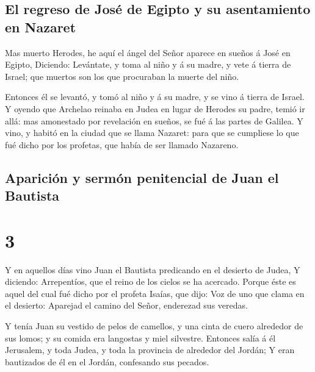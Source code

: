 \hypertarget{el-regreso-de-josuxe9-de-egipto-y-su-asentamiento-en-nazaret}{%
\subsection{El regreso de José de Egipto y su asentamiento en
Nazaret}\label{el-regreso-de-josuxe9-de-egipto-y-su-asentamiento-en-nazaret}}

 Mas muerto Herodes, he aquí el ángel del Señor aparece
en sueños á José en Egipto,  Diciendo: Levántate, y toma
al niño y á su madre, y vete á tierra de Israel; que muertos son los que
procuraban la muerte del niño.

 Entonces él se levantó, y tomó al niño y á su madre, y
se vino á tierra de Israel.  Y oyendo que Archelao
reinaba en Judea en lugar de Herodes su padre, temió ir allá: mas
amonestado por revelación en sueños, se fué á las partes de Galilea.
 Y vino, y habitó en la ciudad que se llama Nazaret: para
que se cumpliese lo que fué dicho por los profetas, que había de ser
llamado Nazareno.

\hypertarget{apariciuxf3n-y-sermuxf3n-penitencial-de-juan-el-bautista}{%
\subsection{Aparición y sermón penitencial de Juan el
Bautista}\label{apariciuxf3n-y-sermuxf3n-penitencial-de-juan-el-bautista}}

\hypertarget{section-2}{%
\section{3}\label{section-2}}

 Y en aquellos días vino Juan el Bautista predicando en el
desierto de Judea,  Y diciendo: Arrepentíos, que el reino
de los cielos se ha acercado.  Porque éste es aquel del
cual fué dicho por el profeta Isaías, que dijo: Voz de uno que clama en
el desierto: Aparejad el camino del Señor, enderezad sus veredas.

 Y tenía Juan su vestido de pelos de camellos, y una cinta
de cuero alrededor de sus lomos; y su comida era langostas y miel
silvestre.  Entonces salía á él Jerusalem, y toda Judea, y
toda la provincia de alrededor del Jordán;  Y eran
bautizados de él en el Jordán, confesando sus pecados.

